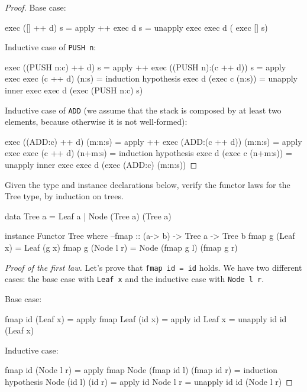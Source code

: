 \documentclass[12pt]{article}
\newenvironment{code}{\endgraf\verbatim}{\endverbatim}
\newenvironment{problem}[2][Problem]{\begin{trivlist}
\item[\hskip \labelsep {\bfseries #1}\hskip \labelsep {\bfseries #2.}]}{\end{trivlist}}
\begin{document}
\begin{proof}
Base case:

\begin{code}
  exec ([] ++ d) s
=   { apply ++ }
  exec d s
=   { unapply exec }
  exec d ( exec [] s)
\end{code}

Inductive case of \verb|PUSH n|:

\begin{code}
  exec ((PUSH n:c) ++ d) s
=   { apply ++ }
  exec ((PUSH n):(c ++ d)) s
=   { apply exec }
  exec (c ++ d) (n:s)
=   { induction hypothesis }
  exec d (exec c (n:s))
=   { unapply inner exec }
  exec d (exec (PUSH n:c) s)
\end{code}

Inductive case of \verb|ADD| (we assume that the stack is composed by at least two elements, because otherwise it is not well-formed):

\begin{code}
  exec ((ADD:c) ++ d) (m:n:s)
=   { apply ++ }
  exec (ADD:(c ++ d)) (m:n:s)
=   { apply exec }
  exec (c ++ d) (n+m:s)
=   { induction hypothesis }
  exec d (exec c (n+m:s))
=   { unapply inner exec }
  exec d (exec (ADD:c) (m:n:s))
\end{code}
\end{proof}


\begin{problem}{3}
Given the type and instance declarations below, verify the functor laws for the Tree type, by induction on trees.

\begin{code}
data Tree a = Leaf a | Node (Tree a) (Tree a)

instance Functor Tree where
    --fmap :: (a-> b) -> Tree a -> Tree b
    fmap g (Leaf x) = Leaf (g x)
    fmap g (Node l r) = Node (fmap g l) (fmap g r)
\end{code}
\end{problem}

\begin{proof}[Proof of the first law]
Let's prove that \verb|fmap id = id| holds. We have two different cases: the base case with \verb|Leaf x| and the inductive case with \verb|Node l r|.

Base case:

\begin{code}
  fmap id (Leaf x)
=   { apply fmap }
  Leaf (id x)
=   { apply id }
  Leaf x
=   { unapply id }
  id (Leaf x)
\end{code}

Inductive case:

\begin{code}
  fmap id (Node l r)
=   { apply fmap }
  Node (fmap id l) (fmap id r)
=   { induction hypothesis }
  Node (id l) (id r)
=   { apply id }
  Node l r
=   { unapply id }
  id (Node l r)
\end{code}
\end{proof}
\end{document}
